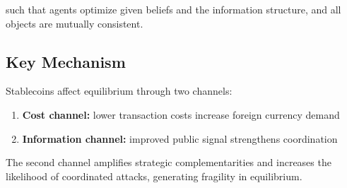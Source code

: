 such that agents optimize given beliefs and the information structure, and all objects are mutually consistent.

\subsection{Key Mechanism}

Stablecoins affect equilibrium through two channels:
\begin{enumerate}
\item \textbf{Cost channel:} lower transaction costs increase foreign currency demand
\item \textbf{Information channel:} improved public signal strengthens coordination
\end{enumerate}

The second channel amplifies strategic complementarities and increases the likelihood of coordinated attacks, generating fragility in equilibrium.
